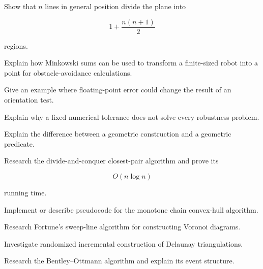 \begin{exercise}[3]
Show that \(n\) lines in general position divide the plane into

\[
1+\frac{n(n+1)}{2}
\]

regions.
\end{exercise}

\begin{exercise}[3]
Explain how Minkowski sums can be used to transform a finite-sized robot into
a point for obstacle-avoidance calculations.
\end{exercise}

\begin{exercise}[3]
Give an example where floating-point error could change the result of an
orientation test.
\end{exercise}

\begin{exercise}[3]
Explain why a fixed numerical tolerance does not solve every robustness
problem.
\end{exercise}

\begin{exercise}[3]
Explain the difference between a geometric construction and a geometric
predicate.
\end{exercise}

\begin{exercise}[4]
Research the divide-and-conquer closest-pair algorithm and prove its

\[
O(n\log n)
\]

running time.
\end{exercise}

\begin{exercise}[4]
Implement or describe pseudocode for the monotone chain convex-hull
algorithm.
\end{exercise}

\begin{exercise}[4]
Research Fortune's sweep-line algorithm for constructing Voronoi diagrams.
\end{exercise}

\begin{exercise}[4]
Investigate randomized incremental construction of Delaunay triangulations.
\end{exercise}

\begin{exercise}[4]
Research the Bentley--Ottmann algorithm and explain its event structure.
\end{exercise}

